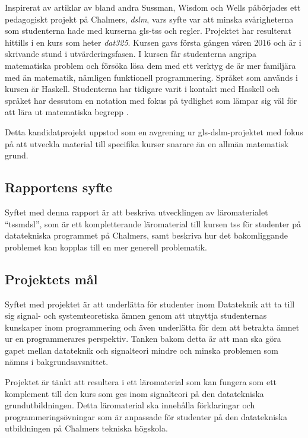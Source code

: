 \documentclass[12pt,a4paper,twoside,openright]{article}
\begin{document}
Inspirerat av artiklar av bland andra Sussman, Wisdom och Wells
påbörjades ett pedagogiskt projekt på Chalmers, \textit{\gls{dslm}},
vars syfte var att minska svårigheterna som studenterna hade med
kurserna \gls{gls-tss} och \gls{regler}. Projektet har resulterat
hittills i en kurs som heter \textit{\gls{dat325}}. Kursen gavs första
gången våren 2016 och är i skrivande stund i utvärderingsfasen. I
kursen får studenterna angripa matematiska problem och försöka lösa
dem med ett verktyg de är mer familjära med än matematik, nämligen
funktionell programmering. Språket som används i kursen är
Haskell. Studenterna har tidigare varit i kontakt med Haskell och
språket har dessutom en notation med fokus på tydlighet som lämpar sig
väl för att lära ut matematiska begrepp
\cite{TFPIE15_DSLsofMath_IonescuJansson}.

Detta kandidatprojekt uppstod som en avgrening ur
\gls{gls-dslm}-projektet med fokus på att utveckla material till
specifika kurser snarare än en allmän matematisk grund.

\subsection{Rapportens syfte}
Syftet med denna rapport är att beskriva utvecklingen av
läromaterialet ``\gls{tssmdsl}'', som är ett kompletterande
läromaterial till kursen \gls{tss} för studenter på datatekniska
programmet på Chalmers, samt beskriva hur det bakomliggande problemet
kan kopplas till en mer generell problematik.

\subsection{Projektets mål}
Syftet med projektet är att underlätta för studenter inom Datateknik
att ta till sig signal- och systemteoretiska ämnen genom att utnyttja
studenternas kunskaper inom programmering och även underlätta för dem
att betrakta ämnet ur en programmerares perspektiv. Tanken bakom detta
är att man ska göra gapet mellan datateknik och signalteori mindre och
minska problemen som nämns i bakgrundsavsnittet.

Projektet är tänkt att resultera i ett läromaterial som kan fungera
som ett komplement till den kurs som ges inom signalteori på den
datatekniska grund\-utbildningen. Detta läromaterial ska innehålla
förklaringar och programmeringsövningar som är anpassade för studenter
på den datatekniska utbildningen på Chalmers tekniska högskola.
\end{document}
